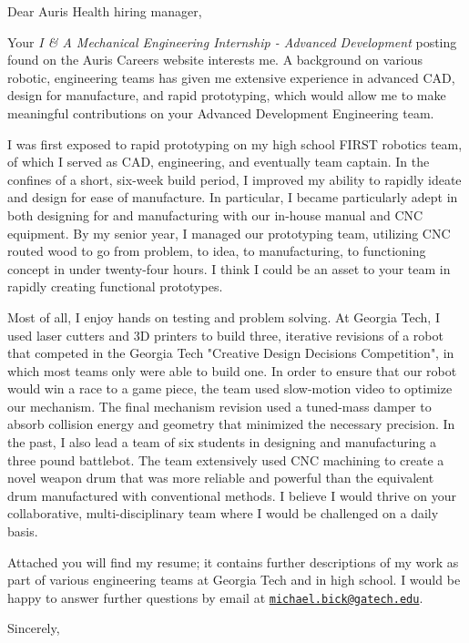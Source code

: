 \documentclass[12pt]{cover_letter}
\date{February 6, 2019}
\begin{document}
  \begin{letter}{}

    \opening{Dear Auris Health hiring manager,}

    \thispagestyle{fancy}

    Your \textit{I \& A Mechanical Engineering Internship - Advanced Development} posting found on the Auris Careers website interests me. A background on various robotic, engineering teams has given me extensive experience in advanced CAD, design for manufacture, and rapid prototyping, which would allow me to make meaningful contributions on your Advanced Development Engineering team.

    I was first exposed to rapid prototyping on my high school FIRST robotics team, of which I served as CAD, engineering, and eventually team captain. In the confines of a short, six-week build period, I improved my ability to rapidly ideate and design for ease of manufacture. In particular, I became particularly adept in both designing for and manufacturing with our in-house manual and CNC equipment. By my senior year, I managed our prototyping team, utilizing CNC routed wood to go from problem, to idea, to manufacturing, to functioning concept in under twenty-four hours. I think I could be an asset to your team in rapidly creating functional prototypes.

    Most of all, I enjoy hands on testing and problem solving. At Georgia Tech, I used laser cutters and 3D printers to build three, iterative revisions of a robot that competed in the Georgia Tech "Creative Design Decisions Competition", in which most teams only were able to build one. In order to ensure that our robot would win a race to a game piece, the team used slow-motion video to optimize our mechanism. The final mechanism revision used a tuned-mass damper to absorb collision energy and geometry that minimized the necessary precision. In the past, I also lead a team of six students in designing and manufacturing a three pound battlebot. The team extensively used CNC machining to create a novel weapon drum that was more reliable and powerful than the equivalent drum manufactured with conventional methods. I believe I would thrive on your collaborative, multi-disciplinary team where I would be challenged on a daily basis.

    Attached you will find my resume; it contains further descriptions of my work as part of various engineering teams at Georgia Tech and in high school. I would be happy to answer further questions by email at \href{mailto:michael.bick@gatech.edu}{\nolinkurl{michael.bick@gatech.edu}}.

    \closing{Sincerely,}

  \end{letter}
\end{document}
